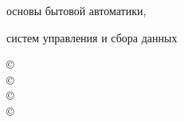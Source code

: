 \begin{titlepage}
\vspace{1.5cm}

\begin{centering}

{\Huge \textbf{\textsc{\thetitle}}}

{\Huge \textbf{\textit{\thesubtitle}}}

{\Large 
основы бытовой автоматики,

систем управления и сбора данных
}

\end{centering}

\vspace{1cm}

{\large
\noindent
\copyright\ \theauthorA
 \\
\copyright\ \theauthorB
\\
\copyright\ \theauthorC
\\
\copyright\ \theauthorD
}
\end{titlepage}
